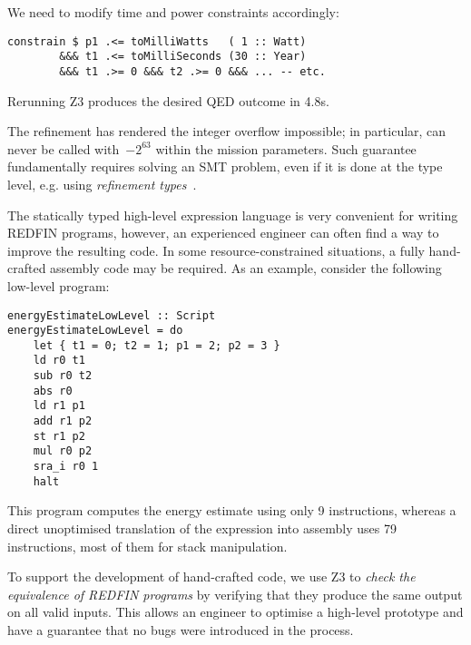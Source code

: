 \noindent
We need to modify time and power constraints accordingly:

\vspace{1mm}
\begin{verbatim}
constrain $ p1 .<= toMilliWatts   ( 1 :: Watt)
        &&& t1 .<= toMilliSeconds (30 :: Year)
        &&& t1 .>= 0 &&& t2 .>= 0 &&& ... -- etc.
\end{verbatim}
\vspace{1mm}

\noindent
Rerunning Z3 produces the desired \textsf{QED} outcome in 4.8s.

The refinement has rendered the integer overflow impossible;
in particular,  can never be called with~$-2^{63}$
within the mission parameters. Such guarantee fundamentally requires
solving an SMT problem, even if it is done at the type level, e.g. using
\emph{refinement types}~\cite{vazou2014refinement}.

The statically typed high-level expression language is very convenient for
writing REDFIN programs, however, an experienced engineer can often find a way
to improve the resulting code. In some resource-constrained situations, a fully
hand-crafted assembly code may be required. As an example, consider the
following low-level program:

\vspace{1mm}
\begin{verbatim}
energyEstimateLowLevel :: Script
energyEstimateLowLevel = do
    let { t1 = 0; t2 = 1; p1 = 2; p2 = 3 }
    ld r0 t1
    sub r0 t2
    abs r0
    ld r1 p1
    add r1 p2
    st r1 p2
    mul r0 p2
    sra_i r0 1
    halt
\end{verbatim}
\label{energyEstimateLowLevel}
\vspace{1mm}

This program computes the energy estimate using only 9 instructions, whereas
a direct unoptimised translation of the  expression into
assembly uses 79 instructions, most of them for stack manipulation.

To support the development of hand-crafted code, we use Z3 to \emph{check the
equivalence of REDFIN programs} by verifying that they produce
the same output on all valid inputs. This allows an engineer to
optimise a high-level prototype and have a guarantee that no bugs were
introduced in the process.

